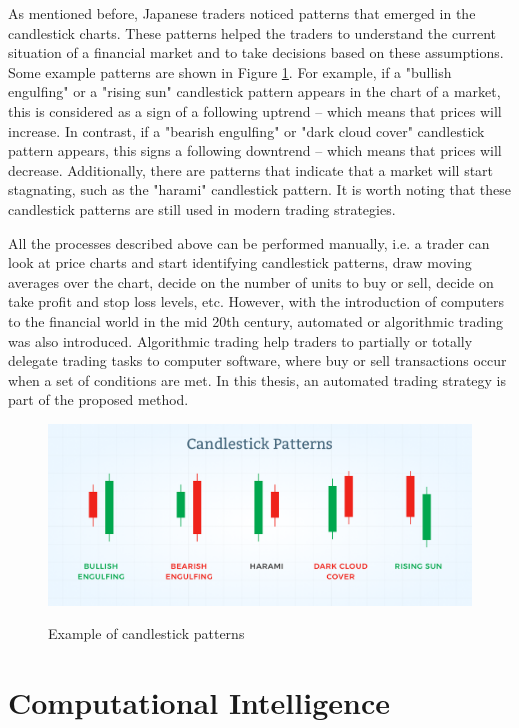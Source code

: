 As mentioned before, Japanese traders noticed patterns that emerged in the candlestick charts. These patterns helped the traders to understand the current situation of a financial market and to take decisions based on these assumptions. Some example patterns are shown in Figure \ref{figure:candlestick-patterns}. For example, if a "bullish engulfing" or a "rising sun" candlestick pattern appears in the chart of a market, this is considered as a sign of a following uptrend -- which means that prices will increase. In contrast, if a "bearish engulfing" or "dark cloud cover" candlestick pattern appears, this signs a following downtrend -- which means that prices will decrease. Additionally, there are patterns that indicate that a market will start stagnating, such as the "harami" candlestick pattern. It is worth noting that these candlestick patterns are still used in modern trading strategies.

All the processes described above can be performed manually, i.e. a trader can look at price charts and start identifying candlestick patterns, draw moving averages over the chart, decide on the number of units to buy or sell, decide on take profit and stop loss levels, etc. However, with the introduction of computers to the financial world in the mid 20th century, automated or algorithmic trading was also introduced. %
Algorithmic trading help traders to partially or totally delegate trading tasks to computer software, where buy or sell transactions occur when a set of conditions are met. In this thesis, an automated trading strategy is part of the proposed method.

\begin{figure}
\caption{Example of candlestick patterns}
\centering
\includegraphics[width=1.0\textwidth]{img/candlestick-patterns.png}
\label{figure:candlestick-patterns}
\end{figure}

\section{Computational Intelligence}
\label{section:computational-intelligence}

